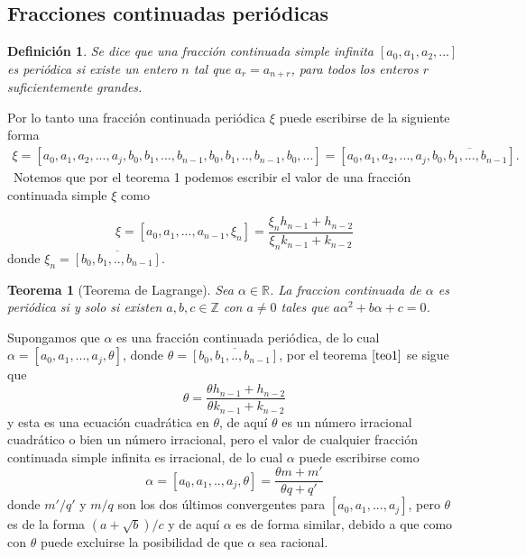\documentclass[11pt, article]{article}
\newtheorem{theorem}{Teorema} %
\newtheorem{definition}{Definición}
\begin{document}
    \subsection*{Fracciones continuadas periódicas}
    
    \begin{definition}
    Se dice que una fracción continuada simple infinita $[a_0,a_1,a_2,...]$ es periódica si existe un entero $n$ tal que $a_r=a_{n+r}$, para todos los enteros $r$ suficientemente grandes.
    \end{definition} 
    
    Por lo tanto una fracción continuada periódica $\xi$ puede escribirse de la siguiente forma
        \begin{align*}
         \xi=[a_0,a_1,a_2,...,a_j,b_0,b_1,...,b_{n-1},b_0,b_1,..,b_{n-1},b_{0},...] 
        =[a_0,a_1,a_2,...,a_j,\overline{b_0,b_1,...,b_{n-1}}].
        \end{align*}
        \
        Notemos que por el teorema 1 podemos escribir el valor de una fracción continuada simple $\xi$ como 

    \begin{equation}
    \xi=[a_0,a_1,...,a_{n-1},\xi_n]=\dfrac{\xi_n h_{n-1} + h_{n-2}}{\xi_n k_{n-1} + k_{n-2}}  \label{ecuacion_8}
    \end{equation}
    donde $\xi_n=\overline{[b_0,b_1,..,b_{n-1}]}$.
    

    \begin{theorem}[Teorema de Lagrange] 
        Sea $\alpha \in \mathbb{R}$. La fraccion continuada de $\alpha$ es periódica si y solo si existen $a, b, c \in\mathbb{Z}$ con $a\not=0$ tales que $a\alpha^2 + b\alpha + c = 0$.
    \end{theorem}

    Supongamos que $\alpha$ es una fracción continuada periódica, de lo cual $\alpha= [a_0,a_1,...,a_{j},\theta]$, donde $\theta=\overline{[b_0,b_1,..,b_{n-1}]}$, por el teorema $\ref{teo1}$ se sigue que
        \[
        \theta =\dfrac{\theta h_{n-1}+h_{n-2}}{\theta k_{n-1}+k_{n-2}}
        \]
    y esta es una ecuación cuadrática en $\theta$, de aquí $\theta$ es un número irracional cuadrático o bien un número irracional, pero el valor de cualquier fracción continuada simple infinita es irracional, de lo cual $\alpha$ puede escribirse como 
        \[
        \alpha = [a_0,a_1,..,a_j,\theta]=\dfrac{\theta m + m'}{\theta q + q'}
        \]
    donde $m'/q'$ y $m/q$ son los dos últimos convergentes para $[a_0,a_1,...,a_j]$, pero $\theta$ es de la forma $(a + \sqrt{b})/c$ y de aquí $\alpha$ es de forma similar, debido a que como con $\theta$ puede excluirse la posibilidad de que $\alpha$ sea racional.
\end{document}

